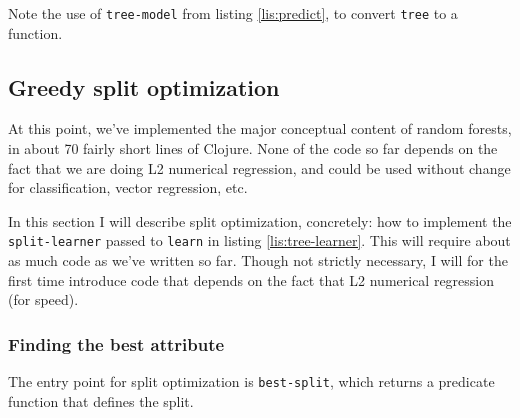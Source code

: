 \documentclass[10pt,openany]{article}
\numberwithin{definition}{section}
\numberwithin{example}{section}
\numberwithin{equation}{section}
\numberwithin{figure}{section}
\begin{document}
Note the use of \texttt{tree-model} from listing \ref{lis:predict},
to convert \texttt{tree} to a function.

\subsection{\label{sub:Split-optimization}Greedy split optimization}

At this point, we've implemented the major conceptual content of random
forests, in about 70 fairly short lines of Clojure. None of the code
so far depends on the fact that we are doing L2 numerical regression,
and could be used without change for classification, vector regression,
etc.

In this section I will describe split optimization, concretely: how
to implement the \texttt{split-learner} passed to \texttt{learn} in
listing \ref{lis:tree-learner}. This will require about as much code
as we've written so far. Though not strictly necessary, I will for
the first time introduce code that depends on the fact that L2 numerical
regression (for speed).


\subsubsection{Finding the best attribute}

The entry point for split optimization is \texttt{best-split}, which
returns a predicate function that defines the split.
\end{document}
